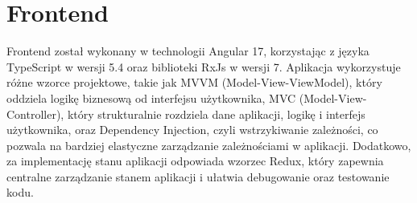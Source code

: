 \section{Frontend}
Frontend został wykonany w technologii Angular 17, korzystając z języka TypeScript w wersji 5.4 oraz biblioteki RxJs w wersji 7.
Aplikacja wykorzystuje różne wzorce projektowe, takie jak MVVM (Model-View-ViewModel), który oddziela logikę biznesową od interfejsu użytkownika, MVC (Model-View-Controller), który strukturalnie rozdziela dane aplikacji, logikę i interfejs użytkownika, oraz Dependency Injection, czyli wstrzykiwanie zależności, co pozwala na bardziej elastyczne zarządzanie zależnościami w aplikacji.
Dodatkowo, za implementację stanu aplikacji odpowiada wzorzec Redux, który zapewnia centralne zarządzanie stanem aplikacji i ułatwia debugowanie oraz testowanie kodu.
